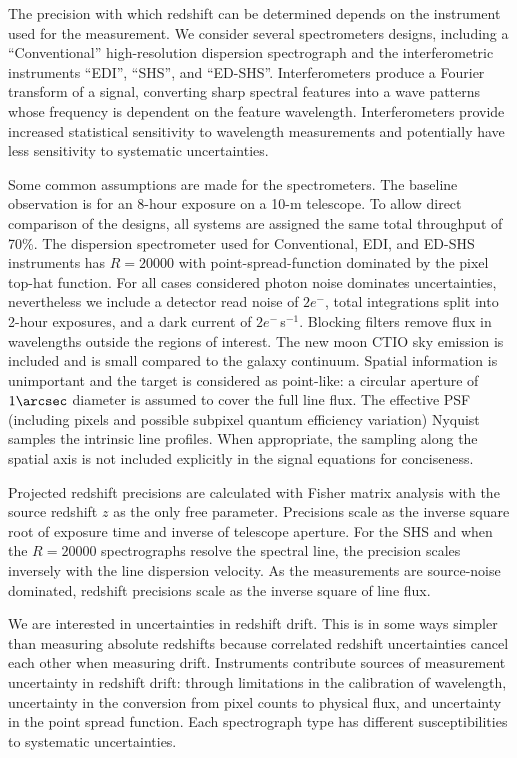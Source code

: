 \documentclass[preprint]{aastex}
\begin{document}
The precision with which redshift can be determined depends on the instrument used for the measurement.
We consider several spectrometers designs, including a ``Conventional'' high-resolution dispersion spectrograph and the
interferometric instruments ``EDI'',
``SHS'', and ``ED-SHS''.  Interferometers produce a Fourier transform of a signal, converting sharp
spectral features into a wave patterns whose frequency is dependent on the feature wavelength.  Interferometers provide
increased statistical sensitivity to wavelength measurements and potentially have less sensitivity to systematic
uncertainties.

Some common assumptions are made for the spectrometers.
The baseline observation is for an 8-hour exposure on a 10-m telescope.
To allow direct comparison of the 
designs, all systems are assigned the same total throughput of 70\%.
The dispersion spectrometer used for Conventional, EDI, and ED-SHS instruments has $R=20000$ with
point-spread-function dominated by the pixel top-hat function.
For all cases considered photon noise dominates uncertainties, nevertheless
we include a detector read noise of $2e^-$, total integrations split into 2-hour exposures, and a dark current of $2e^-$\,s$^{-1}$. 
Blocking filters remove flux in wavelengths outside the regions
of interest.  The new moon CTIO sky emission is included and
is small compared to the galaxy continuum.
Spatial information is unimportant and the target is considered as point-like: a
circular aperture of $1\arcsec$ diameter is assumed to cover the full line flux.
The effective PSF (including pixels and possible subpixel quantum efficiency variation) 
Nyquist samples the intrinsic line profiles.
When appropriate, the sampling along the spatial axis is not included explicitly in the
signal equations for conciseness.


Projected redshift precisions are calculated with Fisher matrix analysis with the source
redshift $z$ as the only free parameter. 
Precisions scale as the inverse square root of exposure time and inverse of telescope aperture. 
For the SHS and when the  $R=20000$ spectrographs resolve the spectral line, the precision scales inversely
with the line dispersion velocity.  
As the measurements
are source-noise dominated, redshift precisions scale as the inverse square of line flux. 

We are interested in uncertainties in redshift drift.  This is in some ways simpler than measuring absolute redshifts
because correlated redshift uncertainties cancel each other when measuring drift.
Instruments contribute sources of measurement uncertainty in redshift drift:  through limitations in the calibration
of wavelength,  uncertainty in the conversion from pixel counts to physical flux, and uncertainty in the point spread function.
Each spectrograph type
has different susceptibilities to  systematic uncertainties.
\end{document}
